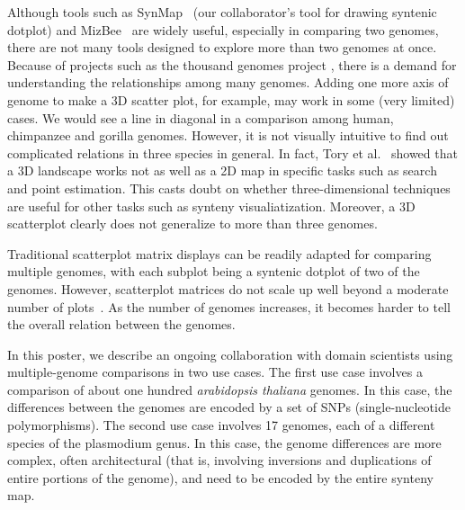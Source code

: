 \documentclass{vgtc}                      %
\begin{document}
Although tools such as SynMap~\cite{synmap} (our collaborator's tool for drawing syntenic dotplot) and MizBee~\cite{meyer2009mizbee} are widely useful, especially in comparing two genomes, there are not many tools designed to explore more than two genomes at once. Because of projects such as the thousand genomes project \cite{1000genomes}, there is a demand for understanding the relationships among many genomes.
Adding one more axis of genome to make a 3D scatter plot, for example, may work in some (very limited) cases. We would see a line in diagonal in a comparison among human, chimpanzee and gorilla genomes\cite{synmap3durl}.
However, it is not visually intuitive to find out complicated relations in three species in general. 
In fact, Tory et al.~\cite{tory2007spatialization} showed that a 3D landscape works not as well as a 2D map in specific tasks such as search and point estimation.
This casts doubt on whether three-dimensional techniques are useful for other tasks such as synteny visualiatization.
Moreover, a 3D scatterplot clearly does not generalize to more than three genomes.

Traditional scatterplot matrix displays can be readily adapted for comparing multiple genomes, with each subplot being a syntenic dotplot of two of the genomes.
However, scatterplot matrices do not scale up well beyond a moderate number of plots~\cite{}.
As the number of genomes increases, it becomes harder to tell the overall relation between the genomes.

In this poster, we describe an ongoing collaboration with domain scientists using multiple-genome comparisons in two use cases.
%
The first use case involves a comparison of about one hundred \emph{arabidopsis thaliana} genomes. In this case, the differences between the genomes are encoded by
a set of SNPs (single-nucleotide polymorphisms).
%
The second use case involves 17 genomes, each of a different species of the plasmodium genus. In this case, the genome differences are more complex, often architectural (that is, involving inversions and duplications of entire portions of the genome), and need to be encoded by the entire synteny map.
\end{document}
